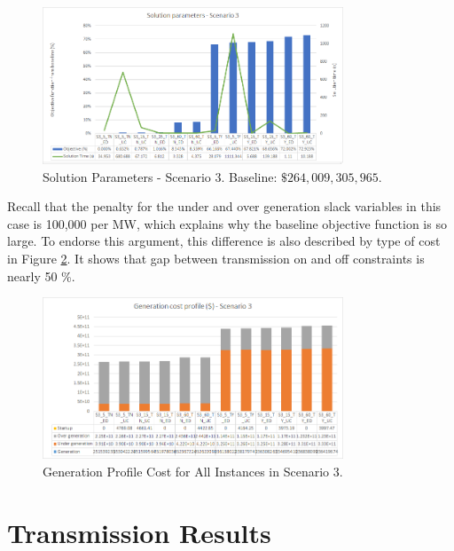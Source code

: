 \documentclass[12pt,LUDisStyle,twosided]{book}
\begin{document}
\begin{figure}[H] 
  \centering
	  \includegraphics[width=0.8\textwidth,height=\textheight,keepaspectratio]{SolutionParametersS3.png}
  \caption{Solution Parameters - Scenario 3. Baseline: $\$264,009,305,965$.}
  \label{fig:solutionparameterss3}
\end{figure}

Recall that the penalty for the under and over generation slack variables in this case is 100,000 per MW, which explains why the baseline objective function is so large. To endorse this argument, this difference is also described by type of cost in Figure \ref{fig:genprofileS3}. It shows that gap between transmission on and off 
constraints is nearly 50 \%.

\begin{figure}[H] 
  \centering
  
	  \includegraphics[width=0.8\textwidth,keepaspectratio]{genprofileS3.png}
  
  \caption{Generation Profile Cost for All Instances in Scenario 3.}
  \label{fig:genprofileS3}
\end{figure}

\newpage

\section{Transmission Results}
\end{document}

